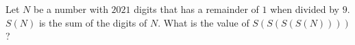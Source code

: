 Let $N$ be a number with $2021$ digits that has a remainder of $1$ when divided by $9$. $S(N)$ is the sum of the digits of $N$. What is the value of $S(S(S(S(N))))$?
